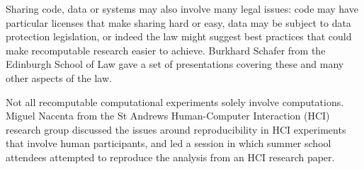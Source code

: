 Sharing code, data or systems may also involve many legal issues: code
may have particular licenses that make sharing hard or easy, data may
be subject to data protection legislation, or indeed the law might
suggest best practices that could make recomputable research easier to
achieve.  Burkhard Schafer from the Edinburgh School of Law gave a set
of presentations covering these and many other aspects of the law.

Not all recomputable computational experiments solely involve
computations. Miguel Nacenta from the St Andrews Human-Computer
Interaction (HCI) research group discussed the issues around
reproducibility in HCI experiments that involve human participants,
and led a session in which summer school attendees attempted to
reproduce the analysis from an HCI research paper.

